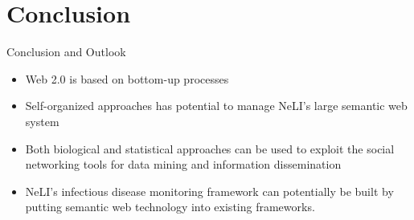 \documentclass{beamer}
\begin{document}
\section{Conclusion}
\begin{frame}[t]{Conclusion and Outlook}
  \begin{itemize}
    \item \small Web 2.0 is based on \alert{bottom-up processes}\\
    \item \small \alert{Self-organized approaches} has potential to manage NeLI's large semantic web system\\
    \item \small Both \alert{biological and statistical approaches} can be used to exploit the social networking tools for data mining and information dissemination\\
    \item \small \alert{NeLI's infectious disease monitoring framework} can potentially be built by putting semantic web technology into existing frameworks.\\
    \end{itemize}
\end{frame}

\end{document}
